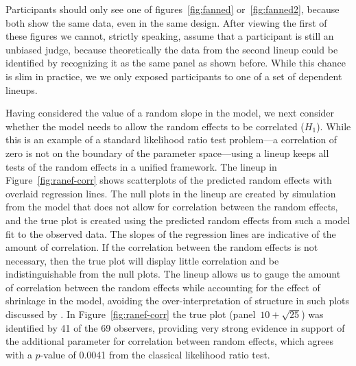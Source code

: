 \documentclass[12pt]{article} %
\newcommand{\al}[1]{{\color{ForestGreen} #1}}
\newcommand{\alnote}[1]{\todo[inline,color=green!40]{#1}} %
\newcommand{\hhnote}[1]{\todo[inline,color=orange!40]{#1}}
\begin{document}

Participants should only see one of figures~\ref{fig:fanned} or~\ref{fig:fanned2}, because both show the same data, even in the same design. After viewing the first of these figures we cannot, strictly speaking, assume that a participant is still an unbiased judge, because theoretically the data from the  second lineup could be identified by recognizing it as the same panel as shown before. While this chance is slim in practice, we \al{we only exposed participants to one of a set of dependent lineups.}

Having considered the value of a random slope in the model, we next consider whether the model needs to allow the random effects to be correlated ($H_1$). While this is an example of a standard likelihood ratio test problem---a correlation of zero is not on the boundary of the parameter space---using a lineup keeps all tests of the random effects in a unified framework. The lineup in Figure~\ref{fig:ranef-corr} shows scatterplots of the predicted random effects with overlaid regression lines. 
 The null plots in the lineup are created by simulation from the model that does not allow for correlation between the random effects, and the true plot is created using the predicted random effects from such a model \al{fit to the observed data.}
The slopes of the regression lines are indicative of the amount of correlation. 
 If the correlation between the random effects is not necessary, then the true plot will display little correlation and be indistinguishable from the null plots.
The lineup allows us to gauge the amount of correlation between the random effects while accounting for the effect of shrinkage in the model, avoiding the over-interpretation of structure in such plots discussed by \cite{Morrell:2000ve}.
  In Figure~\ref{fig:ranef-corr} the true plot (panel~$10 + \sqrt{25}$) was identified by 41 of the 69 observers, providing very strong evidence in  support of  the additional parameter for correlation between random effects, which agrees with a $p$-value of 0.0041 from the classical likelihood ratio test.
\end{document}
